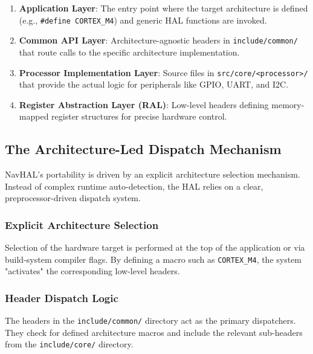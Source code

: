 \begin{enumerate}
    \item \textbf{Application Layer}: The entry point where the target architecture is defined (e.g., \texttt{\#define CORTEX\_M4}) and generic HAL functions are invoked.
    \item \textbf{Common API Layer}: Architecture-agnostic headers in \texttt{include/common/} that route calls to the specific architecture implementation.
    \item \textbf{Processor Implementation Layer}: Source files in \texttt{src/core/<processor>/} that provide the actual logic for peripherals like GPIO, UART, and I2C.
    \item \textbf{Register Abstraction Layer (RAL)}: Low-level headers defining memory-mapped register structures for precise hardware control.
\end{enumerate}

\subsection{The Architecture-Led Dispatch Mechanism}
NavHAL's portability is driven by an explicit architecture selection mechanism. Instead of complex runtime auto-detection, the HAL relies on a clear, preprocessor-driven dispatch system.

\subsubsection{Explicit Architecture Selection}
Selection of the hardware target is performed at the top of the application or via build-system compiler flags. By defining a macro such as \texttt{CORTEX\_M4}, the system "activates" the corresponding low-level headers.

\subsubsection{Header Dispatch Logic}
The headers in the \texttt{include/common/} directory act as the primary dispatchers. They check for defined architecture macros and include the relevant sub-headers from the \texttt{include/core/} directory.

